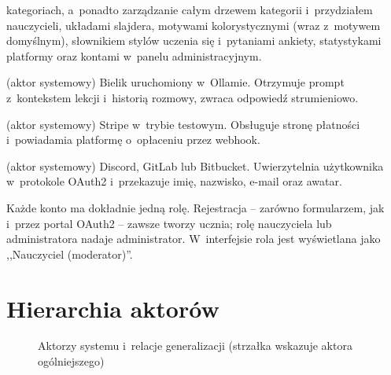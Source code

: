 \begin{description}[style=nextline,leftmargin=0.6cm,font=\sffamily\bfseries]
        kategoriach, a~ponadto zarządzanie całym drzewem kategorii i~przydziałem
        nauczycieli, układami slajdera, motywami kolorystycznymi (wraz z~motywem
        domyślnym), słownikiem stylów uczenia się i~pytaniami ankiety, statystykami platformy oraz kontami w~panelu administracyjnym.
  \item[Model językowy] (aktor systemowy) Bielik uruchomiony w~Ollamie. Otrzymuje prompt
        z~kontekstem lekcji i~historią rozmowy, zwraca odpowiedź strumieniowo.
  \item[Bramka płatności] (aktor systemowy) Stripe w~trybie testowym. Obsługuje stronę
        płatności i~powiadamia platformę o~opłaceniu przez webhook.
  \item[Dostawca tożsamości] (aktor systemowy) Discord, GitLab lub Bitbucket. Uwierzytelnia
        użytkownika w~protokole OAuth2 i~przekazuje imię, nazwisko, e-mail oraz awatar.
\end{description}

Każde konto ma dokładnie jedną rolę. Rejestracja -- zarówno formularzem, jak i~przez
portal OAuth2 -- zawsze tworzy ucznia; rolę nauczyciela lub administratora nadaje
administrator. W~interfejsie rola  jest wyświetlana jako ,,Nauczyciel
(moderator)''.

\section{Hierarchia aktorów}

\begin{figure}[H]
\centering
{}
\caption{Aktorzy systemu i~relacje generalizacji (strzałka wskazuje aktora ogólniejszego)}
\end{figure}

